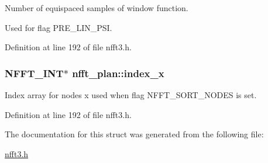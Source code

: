 Number of equispaced samples of window function. 

Used for flag P\-R\-E\-\_\-\-L\-I\-N\-\_\-\-P\-S\-I. 

Definition at line 192 of file nfft3.\-h.

\hypertarget{structnfft__plan_aff966ba9cb0897596c89b6f1b23ee317}{
\subsubsection[{index\-\_\-x}]{\setlength{\rightskip}{0pt plus 5cm}N\-F\-F\-T\-\_\-\-I\-N\-T$\ast$ nfft\-\_\-plan\-::index\-\_\-x}}\label{structnfft__plan_aff966ba9cb0897596c89b6f1b23ee317}


Index array for nodes x used when flag N\-F\-F\-T\-\_\-\-S\-O\-R\-T\-\_\-\-N\-O\-D\-E\-S is set. 



Definition at line 192 of file nfft3.\-h.



The documentation for this struct was generated from the following file\-:\begin{DoxyCompactItemize}
\item 
\hyperlink{nfft3_8h}{nfft3.\-h}\end{DoxyCompactItemize}
